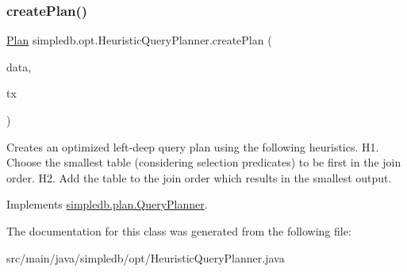 \subsubsection{\texorpdfstring{create\+Plan()}{createPlan()}}
{\footnotesize\ttfamily \hyperlink{interfacesimpledb_1_1plan_1_1Plan}{Plan} simpledb.\+opt.\+Heuristic\+Query\+Planner.\+create\+Plan (\begin{DoxyParamCaption}\item[{\hyperlink{classsimpledb_1_1parse_1_1QueryData}{Query\+Data}}]{data,  }\item[{\hyperlink{classsimpledb_1_1tx_1_1Transaction}{Transaction}}]{tx }\end{DoxyParamCaption})\hspace{0.3cm}{\ttfamily [inline]}}

Creates an optimized left-\/deep query plan using the following heuristics. H1. Choose the smallest table (considering selection predicates) to be first in the join order. H2. Add the table to the join order which results in the smallest output. 

Implements \hyperlink{interfacesimpledb_1_1plan_1_1QueryPlanner_a3fcc576e66a155bdc11845ec3e95838f}{simpledb.\+plan.\+Query\+Planner}.



The documentation for this class was generated from the following file\+:\begin{DoxyCompactItemize}
\item 
src/main/java/simpledb/opt/Heuristic\+Query\+Planner.\+java\end{DoxyCompactItemize}
